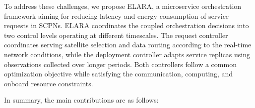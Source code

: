 \documentclass[10pt, conference, letterpaper]{IEEEtran}
\begin{document}
To address these challenges, we propose ELARA, a microservice orchestration framework aiming for reducing latency and energy consumption of service requests in SCPNs. ELARA coordinates the coupled orchestration decisions into two control levels operating at different timescales. The request controller coordinates serving satellite selection and data routing according to the real-time network conditions, while the deployment controller adapts service replicas using observations collected over longer periods. Both controllers follow a common optimization objective while satisfying the communication, computing, and onboard resource constraints.

In summary, the main contributions are as follows:

\end{document}
